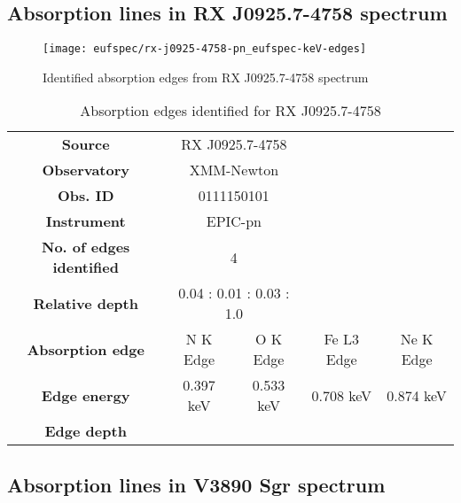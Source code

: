 		\newpage
		\subsection*{Absorption lines in RX J0925.7-4758 spectrum}
			\begin{figure}[h!]
				\centering
				\texttt{[image: eufspec/rx-j0925-4758-pn\_eufspec-keV-edges]}
				\caption{Identified absorption edges from RX J0925.7-4758 spectrum}
				\label{result:absedge-rx-j0925}
			\end{figure}
			
			\renewcommand{\arraystretch}{1.5}
			\begin{table}[!htb]
				\centering
				\caption{Absorption edges identified for RX J0925.7-4758}
				\label{tab:absedge-rx-j0925}
				\begin{tabular}{ccccc}
					\cline{1-3}
					\textbf{Source} & \multicolumn{2}{c}{RX J0925.7-4758} & {} & {} \\
					\textbf{Observatory} & \multicolumn{2}{c}{XMM-Newton} & {} & {} \\
					\textbf{Obs. ID} & \multicolumn{2}{c}{0111150101} & {} & {} \\
					\textbf{Instrument} & \multicolumn{2}{c}{EPIC-pn} & {} & {} \\
					\textbf{No. of edges identified} & \multicolumn{2}{c}{4} & {} & {} \\
					\textbf{Relative depth} & \multicolumn{2}{c}{0.04 : 0.01 : 0.03 : 1.0} & {} & {} \\ \hline
					\textbf{Absorption edge} & {N K Edge} & {O K Edge} & {Fe L3 Edge} & {Ne K Edge} \\
					\textbf{Edge energy} & {0.397 keV} & {0.533 keV} & {0.708 keV} & {0.874 keV} \\
					\textbf{Edge depth} & {} & {} & {} & {} \\ \hline
				\end{tabular}
			\end{table}
			\renewcommand{\arraystretch}{2.2}
		
		\subsection*{Absorption lines in V3890 Sgr spectrum}
    
